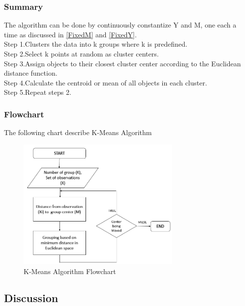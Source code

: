 \documentclass[conference]{IEEEtran}
\begin{document}
\subsubsection{Summary}
\indent The algorithm can be done by continuously constantize Y and M, one each a time as discussed in \ref{FixedM} and \ref{FixedY}.\\
Step 1.Clusters the data into k groups where k  is predefined.\\
Step 2.Select k points at random as cluster centers.\\
Step 3.Assign objects to their closest cluster center according to the Euclidean distance function.\\
Step 4.Calculate the centroid or mean of all objects in each cluster.\\
Step 5.Repeat steps 2.
\subsubsection{Flowchart}
\indent The following chart describe K-Means Algorithm
\begin{figure}[H]
    \centering
    \includegraphics[width=8cm]{fig3}
    \caption{K-Means Algorithm Flowchart}
    \label{fig:fig3}
\end{figure}
\subsection{Discussion}
\end{document}

